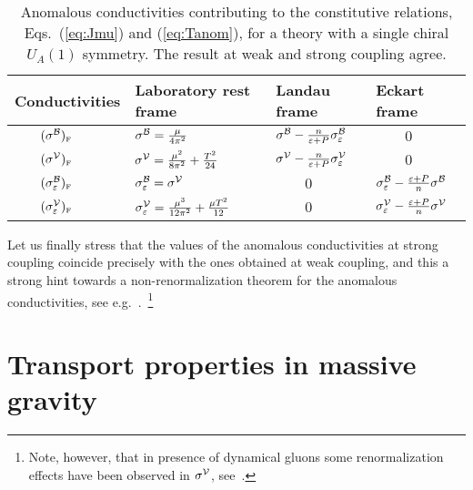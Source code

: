 \documentclass[a4paper]{jpconf}
\begin{document}
\begin{table}[h]
\begin{center}
\begin{tabular}{|l|l|l|l|}
\hline
Conductivities & Laboratory rest frame &  Landau frame & Eckart frame  \\
\hline\hline
 $\qquad (\sigma^{\cal B})_\textrm{\tiny F}$ & $\sigma^{\cal B} =  \frac{ \mu}{4 \pi^2}$   & $\sigma^{\cal B} - \frac{n}{\varepsilon + P} \sigma_{\varepsilon}^{{\cal B}}$    &   $\qquad 0$   \\ 
 $\qquad (\sigma^{\cal V})_\textrm{\tiny F}$ & $\sigma^{\cal V} = \frac{\mu^2}{8\pi^2} + \frac{T^2}{24} $   &  $\sigma^{\cal V} - \frac{n}{\varepsilon + P} \sigma_{\varepsilon}^{{\cal V}}$   & $\qquad 0$   \\
 $\qquad (\sigma_{\varepsilon}^{{\cal B}})_\textrm{\tiny F}$   &  $\sigma_{\varepsilon}^{{\cal B}} = \sigma^{\cal V}$   &  $\qquad 0$     & $\sigma_{\varepsilon}^{{\cal B}} -\frac{\varepsilon + P}{n}\sigma^{\cal B}$     \\
$\qquad (\sigma_{\varepsilon}^{{\cal V}})_\textrm{\tiny F}$  &   $\sigma_{\varepsilon}^{{\cal V}} = \frac{\mu^3}{12 \pi^2} + \frac{\mu T^2}{12}$     &  $\qquad 0$     &  $ \sigma_{\varepsilon}^{{\cal V}} -\frac{\varepsilon+P}{n}\sigma^{\cal V} $      \\
\hline
\end{tabular}
\caption{\label{tab:coef} Anomalous conductivities contributing to the constitutive relations, Eqs.~(\ref{eq:Jmu}) and (\ref{eq:Tanom}), for a theory with a single chiral $U_A(1)$ symmetry. The result at weak and strong coupling agree.}
\end{center}
\end{table}

Let us finally stress that the values of the anomalous conductivities at strong coupling coincide precisely with the ones obtained at weak coupling, and this a strong hint towards a non-renormalization theorem for the anomalous conductivities, see e.g.~\cite{Landsteiner:2011cp,Landsteiner:2011iq,Landsteiner:2011tf}.~\footnote{Note, however, that in presence of dynamical gluons some renormalization effects have been observed in $\sigma^{\cal V}$, see~\cite{Hou:2012xg,Jensen:2012kj,Jensen:2013vta,Golkar:2012kb}.}
  


\section{Transport properties in massive gravity}
\label{sec:massive_gravity}
\end{document}
